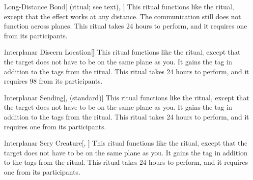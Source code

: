 \lowercase{\hypertarget{spell:Long-Distance Bond}{}}\label{spell:Long-Distance Bond}
\begin{attuneability}[Rank 6]{\hypertarget{spell:Long-Distance Bond}{Long-Distance Bond}}[ (ritual; see text), ]
This ritual functions like the  ritual, except that the effect works at any distance.
The communication still does not function across planes.
This ritual takes 24 hours to perform, and it requires one  from its participants.
\end{attuneability}
\vspace{0.25em}



\lowercase{\hypertarget{spell:Interplanar Discern Location}{}}\label{spell:Interplanar Discern Location}
\begin{freeability}[Rank 7]{\hypertarget{spell:Interplanar Discern Location}{Interplanar Discern Location}}[]
This ritual functions like the  ritual, except that the target does not have to be on the same plane as you.
It gains the  tag in addition to the tags from the  ritual.
This ritual takes 24 hours to perform, and it requires 98  from its participants.
\end{freeability}
\vspace{0.25em}



\lowercase{\hypertarget{spell:Interplanar Sending}{}}\label{spell:Interplanar Sending}
\begin{freeability}[Rank 7]{\hypertarget{spell:Interplanar Sending}{Interplanar Sending}}[,  (standard)]
This ritual functions like the  ritual, except that the target does not have to be on the same plane as you.
It gains the  tag in addition to the tags from the  ritual.
This ritual takes 24 hours to perform, and it requires one  from its participants.
\end{freeability}
\vspace{0.25em}



\lowercase{\hypertarget{spell:Interplanar Scry Creature}{}}\label{spell:Interplanar Scry Creature}
\begin{freeability}[Rank 8]{\hypertarget{spell:Interplanar Scry Creature}{Interplanar Scry Creature}}[, ]
This ritual functions like the  ritual, except that the target does not have to be on the same plane as you.
It gains the  tag in addition to the tags from the  ritual.
This ritual takes 24 hours to perform, and it requires one  from its participants.
\end{freeability}
\vspace{0.25em}



